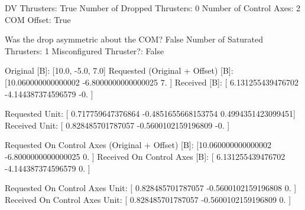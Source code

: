 DV Thrusters:	True
Number of Dropped Thrusters:	0
Number of Control Axes:	2
COM Offset:	True

Was the drop asymmetric about the COM?	False
Number of Saturated Thrusters:	1
Misconfigured Thruster?:	False

Original [B]:	[10.0, -5.0, 7.0]
Requested (Original + Offset) [B]:	[10.060000000000002  -6.8000000000000025  7.                ]
Received [B]:		[ 6.131255439476702 -4.144387374596579 -0.               ]

Requested Unit:		[ 0.717759647376864  -0.4851655668153754  0.4994351423099451]
Received Unit:		[ 0.828485701787057  -0.5600102159196809 -0.                ]

Requested On Control Axes (Original + Offset) [B]:	[10.060000000000002  -6.8000000000000025  0.                ]
Received On Control Axes [B]:		[ 6.131255439476702 -4.144387374596579  0.               ]

Requested On Control Axes Unit:		[ 0.828485701787057  -0.5600102159196808  0.                ]
Received On Control Axes Unit:		[ 0.828485701787057  -0.5600102159196809  0.                ]

